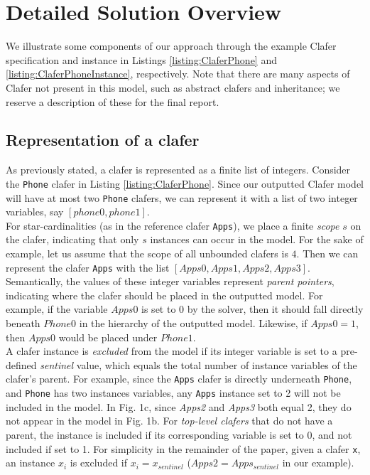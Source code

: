\documentclass{article}
\begin{document}
\section{Detailed Solution Overview}
We illustrate some components of our approach through the example Clafer specification and instance in Listings \ref{listing:ClaferPhone} and \ref{listing:ClaferPhoneInstance}, respectively. Note that there are many aspects of Clafer not present in this model, such as abstract clafers and inheritance; we reserve a description of these for the final report.
\subsection{Representation of a clafer}
As previously stated, a clafer is represented as a finite list of integers. Consider the \texttt{Phone} clafer in Listing \ref{listing:ClaferPhone}. Since our outputted Clafer model will have at most two \texttt{Phone} clafers, we can represent it with a list of two integer variables, say $[phone0, phone1]$.  \\
\indent For star-cardinalities (as in the reference clafer \texttt{Apps}), we place a finite \textit{scope} $s$ on the clafer, indicating that only $s$ instances can occur in the model. For the sake of example, let us assume that the scope of all unbounded clafers is $4$. Then we can represent the clafer \texttt{Apps} with the list $[Apps0, Apps1, Apps2, Apps3]$.\\
\indent Semantically, the values of these integer variables represent \textit{parent pointers}, indicating where the clafer should be placed in the outputted model. For example, if the variable $Apps0$ is set to $0$ by the solver, then it should fall directly beneath $Phone0$ in the hierarchy of the outputted model. Likewise, if $Apps0 = 1$, then $Apps0$ would be placed under $Phone1$.\\
\indent A clafer instance is \textit{excluded} from the model if its integer variable is set to a pre-defined \textit{sentinel} value, which equals the total number of instance variables of the clafer's parent. For example, since the \texttt{Apps} clafer is directly underneath \texttt{Phone}, and \texttt{Phone} has two instances variables, any \texttt{Apps} instance set to 2 will not be included in the model. In Fig. 1c, since \textit{Apps2} and \textit{Apps3} both equal 2, they do not appear in the model in Fig. 1b. For \textit{top-level clafers} that do not have a parent, the instance is included if its corresponding variable is set to 0, and not included if set to 1. For simplicity in the remainder of the paper, given a clafer \texttt{x}, an instance \textit{$x_i$} is excluded if  $x_i = x_{sentinel}$ ($Apps2 = Apps_{sentinel}$ in our example). \\
\end{document}
